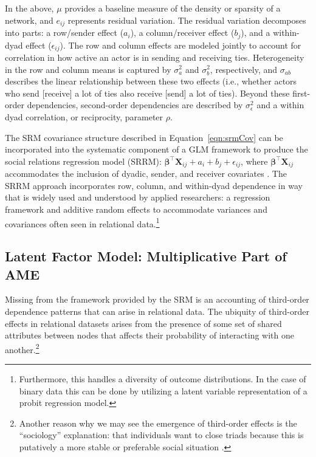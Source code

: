 \documentclass[9pt,twocolumn,twoside,lineno]{pnas-new}
\begin{document}
In the above, $\mu$ provides a baseline measure of the density or sparsity of a network, and $e_{ij}$ represents residual variation. The residual variation decomposes into parts: a row/sender effect ($a_{i}$), a column/receiver effect ($b_{j}$), and a within-dyad effect ($\epsilon_{ij}$). The row and column effects are modeled jointly to account for correlation in how active an actor is in sending and receiving ties. Heterogeneity in the row and column means is captured by $\sigma_{a}^{2}$ and $\sigma_{b}^{2}$, respectively, and $\sigma_{ab}$ describes the linear relationship between these two effects (i.e., whether actors who send [receive] a lot of ties also receive [send] a lot of ties). Beyond these first-order dependencies, second-order dependencies are described by $\sigma_{\epsilon}^{2}$ and a within dyad correlation, or reciprocity, parameter $\rho$. 

The SRM covariance structure described in Equation~\ref{eqn:srmCov} can be incorporated into the systematic component of a GLM framework to produce the social relations regression model (SRRM): $\bm\beta^{\top} \mathbf{X}_{ij} + a_{i} + b_{j} + \epsilon_{ij}$, where $ \bm\beta^{\top} \mathbf{X}_{ij}$ accommodates the inclusion of dyadic, sender, and receiver covariates \citep{hoff:2005}. The SRRM approach incorporates row, column, and within-dyad dependence in way that is widely used and understood by applied researchers: a regression framework and additive random effects to accommodate variances and covariances often seen in relational data.\footnote{Furthermore, this  handles a diversity of outcome distributions. In the case of binary data this can be done by utilizing a latent variable representation of a probit regression model.}

\subsection*{Latent Factor Model: Multiplicative Part of AME}

Missing from the framework provided by the SRM is an accounting of third-order dependence patterns that can arise in relational data. The ubiquity of third-order effects in relational datasets arises from the presence of some set of shared attributes between nodes that affects their probability of interacting with one another.\footnote{Another reason why we may see the emergence of third-order effects is the ``sociology'' explanation: that individuals want to close triads because this is putatively a more stable or preferable social situation \citep{wasserman:faust:1994}.}
\end{document}
